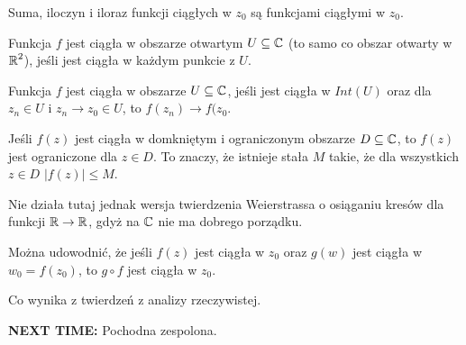 Suma, iloczyn i iloraz funkcji ciągłych w $z_0$ są funkcjami ciągłymi w $z_0$. 

\begin{definition} 
  Funkcja $f$ jest ciągła w obszarze otwartym $U\subseteq \operatorname{\mathbb{C}}$ (to samo co obszar otwarty w $\operatorname{\mathbb{R}}^2$), jeśli jest ciągła w każdym punkcie z $U$.

  Funkcja $f$ jest ciągła w obszarze $U\subseteq \operatorname{\mathbb{C}}$, jeśli jest ciągła w $Int(U)$ oraz dla $z_n\in U$ i $z_n\to z_0\in U$, to $f(z_n)\to f(z_0$.
\end{definition}

\begin{theorem}[Weierstrassa]
  Jeśli $f(z)$ jest ciągła w domkniętym i ograniczonym obszarze $D\subseteq\operatorname{\mathbb{C}}$, to $f(z)$ jest ograniczone dla $z\in D$. To znaczy, że istnieje stała $M$ takie, że dla wszystkich $z\in D$ $|f(z)|\leq M$.
\end{theorem}

Nie działa tutaj jednak wersja twierdzenia Weierstrassa o osiąganiu kresów dla funkcji $\operatorname{\mathbb{R}}\to\operatorname{\mathbb{R}}$, gdyż na $\operatorname{\mathbb{C}}$ nie ma dobrego porządku.

\begin{lemma}
  Można udowodnić, że jeśli $f(z)$ jest ciągła w $z_0$ oraz $g(w)$ jest ciągła w $w_0=f(z_0)$, to $g\circ f$ jest ciągła w $z_0$.
\end{lemma}

Co wynika z twierdzeń z analizy rzeczywistej.

\begin{center}
  \Large \textbf{NEXT TIME:} Pochodna zespolona.
\end{center}

